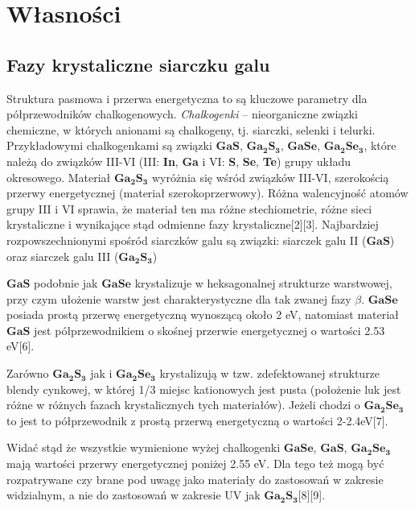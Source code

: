\newpage

\section{Własności}

\subsection{Fazy krystaliczne siarczku galu}
Struktura pasmowa i przerwa energetyczna to są kluczowe parametry dla półprzewodników chalkogenowych. \textit{Chalkogenki} – nieorganiczne związki chemiczne, w których anionami są chalkogeny, tj. siarczki, selenki i telurki. Przykładowymi chalkogenkami są związki $\mathbf{GaS}$, $\mathbf{Ga_{2}S_{3}}$, $\mathbf{GaSe}$, $\mathbf{Ga_{2}Se_{3}}$, które należą do związków III-VI (III: \textbf{In}, \textbf{Ga} i VI: \textbf{S}, \textbf{Se}, \textbf{Te}) grupy układu okresowego. Materiał  $\mathbf{Ga_{2}S_{3}}$ wyróżnia się wśród związków III-VI, szerokością przerwy energetycznej (materiał szerokoprzerwowy). Różna walencyjność atomów grupy III i VI sprawia, że materiał ten ma różne stechiometrie, różne sieci krystaliczne i wynikające stąd odmienne fazy krystaliczne[2][3]. Najbardziej rozpowszechnionymi spośród siarczków galu są związki: siarczek galu II ($\mathbf{GaS}$) oraz siarczek galu III ($\mathbf{Ga_{2}S_{3}}$) 

$\mathbf{GaS}$ podobnie jak $\mathbf{GaSe}$ krystalizuje w heksagonalnej strukturze warstwowej, przy czym ułożenie warstw jest charakterystyczne dla tak zwanej fazy $\beta$. $\mathbf{GaSe}$ posiada prostą przerwę energetyczną wynoszącą około 2 eV, natomiast materiał $\mathbf{GaS}$ jest półprzewodnikiem o skośnej przerwie energetycznej o wartości 2.53 eV[6].

Zarówno $\mathbf{Ga_{2}S_{3}}$ jak i $\mathbf{Ga_{2}Se_{3}}$ krystalizują w tzw. zdefektowanej strukturze blendy cynkowej, w której 1/3 miejsc kationowych jest pusta (położenie luk jest różne w różnych fazach krystalicznych tych materiałów). Jeżeli chodzi o $\mathbf{Ga_{2}Se_{3}}$ to jest to półprzewodnik z prostą przerwą energetyczną o wartości 2-2.4eV[7].

Widać stąd że wszystkie wymienione wyżej chalkogenki $\mathbf{GaSe}$, $\mathbf{GaS}$, $\mathbf{Ga_{2}Se_{3}}$ mają wartości przerwy energetycznej poniżej 2.55 eV. Dla tego też mogą być rozpatrywane czy brane pod uwagę jako materiały do zastosowań w zakresie widzialnym, a nie do zastosowań w zakresie UV jak $\mathbf{Ga_{2}S_{3}}$[8][9].

